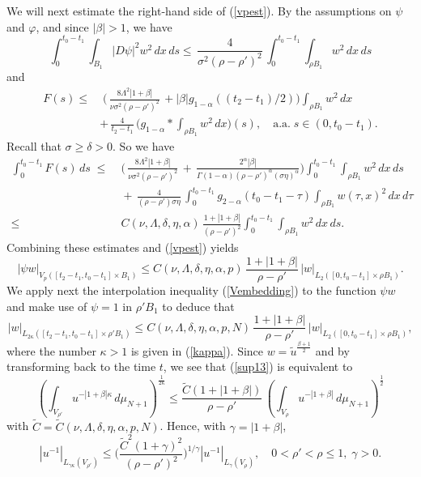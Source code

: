 \documentclass[10pt]{article}
\begin{document}
We will next estimate the right-hand side of (\ref{vpest}). By the
assumptions on $\psi$ and $\varphi$, and since $|\beta|>1$, we
have
\[ \int_0^{t_0-t_1}\!\!\!\int_{B_1} |D\psi|^2
w^2\,dx\,ds\le
\,\frac{4}{\sigma^2(\rho-\rho')^2}\,\int_0^{t_0-t_1}
\!\!\!\int_{\rho B_1}w^2\,dx\,d{s}
\]
and
\begin{align*}
F(s)\le &\;\Big(\,\frac{8\Lambda^2|1+\beta|}{\nu
\sigma^2(\rho-\rho')^2}\,+|\beta|g_{1-\alpha}((t_2-t_1)/2)\Big)\int_{\rho
B_1}w^2\,dx \nonumber\\ &
+\,\frac{4}{t_2-t_1}\,\big(g_{1-\alpha}\ast \int_{\rho B_1}
w^2\,dx\big)(s),\quad \mbox{a.a.}\;s\in (0,t_0-t_1).
\end{align*}
Recall that $\sigma\ge \delta>0$. So we have
\begin{align*}
\int_0^{t_0-t_1} \!\!\!\!F(s)\,ds \;\le &\;
\Big(\,\frac{8\Lambda^2|1+\beta|}{\nu
\sigma^2(\rho-\rho')^2}\,+\,\frac{2^\alpha|\beta|}
{\Gamma(1-\alpha)(\rho-\rho')^\alpha(\sigma\eta)^\alpha}
\Big)\int_0^{t_0-t_1} \!\!\!\int_{\rho B_1}w^2\,dx\,ds\\
&
\;+\,\frac{4}{(\rho-\rho')\sigma\eta}\,\int_0^{t_0-t_1}g_{2-\alpha}(t_0-t_1-\tau)
\int_{\rho B_1}w(\tau,x)^2\,dx\,d\tau \\
\le & \;
C(\nu,\Lambda,\delta,\eta,\alpha)\,\frac{1+|1+\beta|}{(\rho-\rho')^2}
\int_0^{t_0-t_1} \!\!\!\int_{\rho B_1}w^2\,dx\,ds.
\end{align*}
Combining these estimates and (\ref{vpest}) yields
\[
|\psi w|_{V_p([t_2-t_1,t_0-t_1]\times B_1)}\le
C(\nu,\Lambda,\delta,\eta,\alpha,p)\,\frac{1+|1+\beta|}
{\rho-\rho'}\, |w|_{L_{2}([0,t_0-t_1]\times\rho B_1)}.
\]
We apply next the interpolation inequality (\ref{Vembedding}) to
the function $\psi w$ and make use of $\psi=1$ in $\rho'B_1$ to
deduce that
\begin{equation} \label{sup13}
|w|_{L_{2\kappa}([t_2-t_1,t_0-t_1]\times \rho'B_1)}\le
C(\nu,\Lambda,\delta,\eta,\alpha,p,N)\,\frac{1+|1+\beta|}{\rho-\rho'}
\,|w|_{L_{2}([0,t_0-t_1]\times \rho B_1)},
\end{equation}
where the number $\kappa>1$ is given in (\ref{kappa}). Since
$w=\tilde{u}^{\frac{\beta+1}{2}}$ and by transforming back to the
time $t$, we see that (\ref{sup13}) is equivalent to
\[
(\int_{V_{\rho'}}
u^{-|1+\beta|\kappa}\,d\mu_{N+1})^{\frac{1}{2\kappa}}\le
\frac{\tilde{C}(1+|1+\beta|)}{\rho-\rho'}\,(\int_{V_{\rho}}
u^{-|1+\beta|}\,d\mu_{N+1})^{\frac{1}{2}}
\]
with $\tilde{C}=\tilde{C}(\nu,\Lambda,\delta,\eta,\alpha,p,N)$.
Hence, with $\gamma=|1+\beta|$,
\[
|u^{-1}|_{L_{\gamma\kappa}(V_{\rho'})}\le
\Big(\frac{\tilde{C}^2(1+\gamma)^2}{(\rho-\rho')^2}\Big)^{1/\gamma}
|u^{-1}|_{L_{\gamma}(V_{\rho})},\quad 0<\rho'<\rho\le
1,\;\gamma>0.
\]
\end{document}
